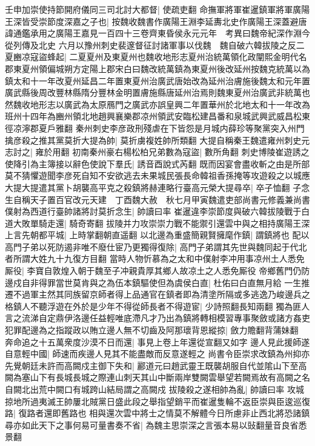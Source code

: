 壬申加崇使持節開府儀同三司北討大都督|{
	使疏吏翻}
命撫軍將軍崔暹鎮軍將軍廣陽王深皆受崇節度深嘉之子也|{
	按魏收魏書作廣陽王淵李延夀北史作廣陽王深蓋避唐諱通鑑承用之廣陽王嘉見一百四十三卷齊東昏侯永元元年　考異曰魏帝紀深作淵今從列傳及北史}
六月以豫州刺史裴邃督征討諸軍事以伐魏　魏自破六韓拔陵之反二夏豳凉寇盜蜂起|{
	二夏夏州及東夏州也魏收地形志夏州治統萬領化政闡熙金明代名郡東夏州領偏城朔方定陽上郡宋白曰魏改統萬鎮為東夏州後改延州按魏克統萬以為鎮太和十一年改夏州延昌二年置東夏州治廣武唐始改為延州治膚施後魏太和元年置廣武縣後周改豐林縣隋分豐林金明置膚施縣唐延州治焉則魏東夏州治廣武非統萬也然魏收地形志以廣武為太原鴈門之廣武亦誤皇興二年置華州於北地太和十一年改為班州十四年為豳州領北地趙興襄樂郡凉州領武安臨松建昌番和泉城武興武威昌松東徑凉濘郡夏戶雅翻}
秦州刺史李彦政刑殘虐在下皆怨是月城内薛珍等聚黨突入州門擒彦殺之推其黨莫折大提為帥|{
	莫折虜複姓帥所類翻}
大提自稱秦王魏遣雍州刺史元志討之|{
	雍於用翻}
初南秦州豪右楊松柏兄弟數為寇盜|{
	數所角翻}
刺史博陵崔遊誘之使降引為主簿接以辭色使說下羣氏|{
	誘音酉說式芮翻}
既而因宴會盡收斬之由是所部莫不猜懼遊聞李彦死自知不安欲逃去未果城民張長命韓祖香孫掩等攻遊殺之以城應大提大提遣其黨卜胡襲高平克之殺鎮將赫連略行臺高元榮大提尋卒|{
	卒子恤翻}
子念生自稱天子置百官改元天建　丁酉魏大赦　秋七月甲寅魏遣吏部尚書元修義兼尚書僕射為西道行臺帥諸將討莫折念生|{
	帥讀曰率}
崔暹違李崇節度與破六韓拔陵戰于白道大敗單騎走還|{
	騎奇寄翻}
拔陵并力攻崇崇力戰不能禦引還雲中與之相持廣陽王深上言先朝都平城|{
	上時掌翻朝直遥翻}
以北邊為重盛簡親賢擁麾作鎮|{
	謂鎮將也}
配以高門子弟以死防遏非唯不廢仕宦乃更獨得復除|{
	高門子弟謂其先世與魏同起于代北者所謂大姓九十九復方目翻}
當時人物忻慕為之太和中僕射李冲用事凉州土人悉免厮役|{
	李寶自敦煌入朝于魏至子冲親貴厚其鄉人故凉土之人悉免厮役}
帝鄉舊門仍防邊戍自非得罪當世莫肯與之為伍本鎮驅使但為虞侯白直|{
	杜佑曰白直無月給}
一生推遷不過軍主然其同族留京師者得上品通官在鎮者即為清塗所隔或多逃逸乃峻邊兵之格鎮人不聽浮遊在外於是少年不得從師長者不得遊宦|{
	少詩照翻長知兩翻}
獨為匪人言之流涕自定鼎伊洛邊任益輕唯底滯凡才乃出為鎮將轉相模習專事聚斂或諸方姦吏犯罪配邊為之指蹤政以賄立邊人無不切齒及阿那瓌背恩縱掠|{
	斂力贍翻背蒲妹翻}
奔命追之十五萬衆度沙漠不日而還|{
	事見上卷上年還從宣翻又如字}
邊人見此援師遂自意輕中國|{
	師速而疾邊人見其不能盡敵而反意遂輕之}
尚書令臣崇求改鎮為州抑亦先覺朝廷未許而高闕戍主御下失和|{
	酈道元曰趙武靈王既襲胡服自代並隂山下至高闕為塞山下有長城長城之際連山刺天其山中斷兩岸雙闕雲舉望若闕焉故有高闕之名自闕北出荒中闕口有城跨山結局謂之高闕戍}
拔陵殺之遂相帥為亂|{
	帥讀曰率}
攻城掠地所過夷滅王帥屢北賊黨日盛此段之舉指望銷平而崔暹隻輪不返臣崇與臣逡巡復路|{
	復路者還即舊路也}
相與還次雲中將士之情莫不解體今日所慮非止西北將恐諸鎮尋亦如此天下之事何易可量書奏不省|{
	為魏主思崇深之言張本易以䜴翻量音良省悉景翻}
